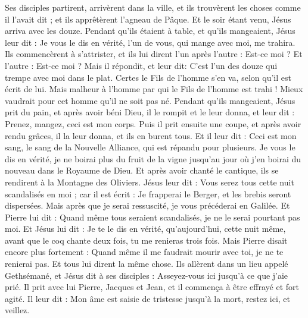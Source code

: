 \begin{multicols}{2}
Ses disciples partirent, arrivèrent dans la ville, et ils trouvèrent les choses comme il l'avait dit ; et ils apprêtèrent l'agneau de Pâque.
Et le soir étant venu, Jésus arriva avec les douze.
Pendant qu'ils étaient à table, et qu'ils mangeaient, Jésus leur dit : Je vous le dis en vérité, l'un de vous, qui mange avec moi, me trahira.
Ils commencèrent à s'attrister, et ils lui dirent l'un après l'autre : Est-ce moi ? Et l'autre : Est-ce moi ?
Mais il répondit, et leur dit: C'est l'un des douze qui trempe avec moi dans le plat.
Certes le Fils de l'homme s'en va, selon qu'il est écrit de lui. Mais malheur à l'homme par qui le Fils de l'homme est trahi ! Mieux vaudrait pour cet homme qu'il ne soit pas né.
Pendant qu'ils mangeaient, Jésus prit du pain, et après avoir béni Dieu, il le rompit et le leur donna, et leur dit : Prenez, mangez, ceci est mon corps.
Puis il prit ensuite une coupe, et après avoir rendu grâces, il la leur donna, et ils en burent tous.
Et il leur dit : Ceci est mon sang, le sang de la Nouvelle Alliance, qui est répandu pour plusieurs.
Je vous le dis en vérité, je ne boirai plus du fruit de la vigne jusqu'au jour où j'en boirai du nouveau dans le Royaume de Dieu.
Et après avoir chanté le cantique, ils se rendirent à la Montagne des Oliviers.
Jésus leur dit : Vous serez tous cette nuit scandalisés en moi ; car il est écrit : Je frapperai le Berger, et les brebis seront dispersées.
Mais après que je serai ressuscité, je vous précéderai en Galilée.
Et Pierre lui dit : Quand même tous seraient scandalisés, je ne le serai pourtant pas moi.
Et Jésus lui dit : Je te le dis en vérité, qu'aujourd'hui, cette nuit même, avant que le coq chante deux fois, tu me renieras trois fois.
Mais Pierre disait encore plus fortement : Quand même il me faudrait mourir avec toi, je ne te renierai pas. Et tous lui dirent la même chose.
Ils allèrent dans un lieu appelé Gethsémané, et Jésus dit à ses disciples : Asseyez-vous ici jusqu'à ce que j'aie prié.
Il prit avec lui Pierre, Jacques et Jean, et il commença à être effrayé et fort agité.
Il leur dit : Mon âme est saisie de tristesse jusqu'à la mort, restez ici, et veillez.

\end{multicols}
